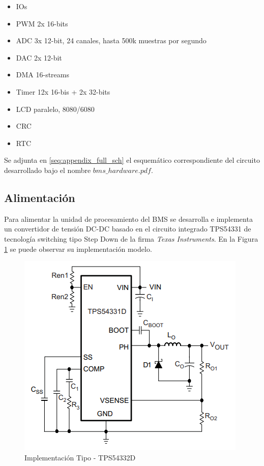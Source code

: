 \documentclass[10pt, a4paper]{report}
\begin{document}
\begin{itemize}
    \item IOs
    \item PWM 2x 16-bits
    \item ADC 3x 12-bit, 24 canales, hasta 500k muestras por segundo              
    \item DAC 2x 12-bit 
    \item DMA 16-streams
    \item Timer 12x 16-bis + 2x 32-bits 
    \item LCD paralelo, 8080/6080 
    \item CRC
    \item RTC
\end{itemize}                                                                    
                                                                                 
Se adjunta en \autoref{seq:appendix_full_sch} el esquemático correspondiente del circuito 
desarrollado bajo el nombre $bms\_hardware.pdf$.                   
                                                               
\subsection{Alimentación}

Para alimentar la unidad de procesamiento del \acrshort{BMS} se desarrolla e
implementa un convertidor de tensión DC-DC basado en el circuito integrado
TPS54331 de tecnología switching tipo Step Down de la firma \emph{Texas
Instruments}. En la Figura \ref{fig:TPS54332D_common_implementation} se puede
observar su implementación modelo. 

\begin{figure}[h!]
    \begin{center}
	\includegraphics[width=0.4\linewidth]{assets/TPS54332D_common_implementation.png}
	\caption{Implementación Tipo - TPS54332D}
	\label{fig:TPS54332D_common_implementation}
    \end{center}	
\end{figure}
\end{document}
